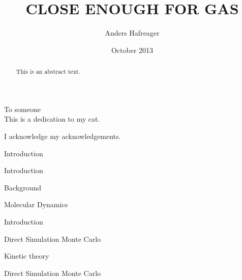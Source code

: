 \documentclass[twoside,english, a4paper, 12pt]{uiofysmaster}
\author{Anders Hafreager}
\title{\uppercase{Close enough for gas}}
\date{October 2013}
\begin{document}
\maketitle
\clearpage

\begin{abstract}
This is an abstract text.
\end{abstract}
\begin{dedication}
  To someone
  \\\vspace{12pt}
  This is a dedication to my cat.
\end{dedication}
\begin{acknowledgements}
  I acknowledge my acknowledgements.
\end{acknowledgements}

\tableofcontents
\clearpage
\listoffigures
\clearpage
\listoftables

\begin{part}{Introduction}
\begin{chapter}{Introduction}
  
\end{chapter}

\begin{chapter}{Background}
  
  
  
\end{chapter}
\end{part}

\begin{part}{Molecular Dynamics}
  \begin{chapter}{Introduction}
  
  \end{chapter}
  
  
\end{part}

\begin{part}{Direct Simulation Monte Carlo}

\begin{chapter}{Kinetic theory}
  
  
  
  
\end{chapter}

\begin{chapter}{Direct Simulation Monte Carlo}
  
  
  
  
  
  
  
\end{chapter}
\end{part}
\end{document}
